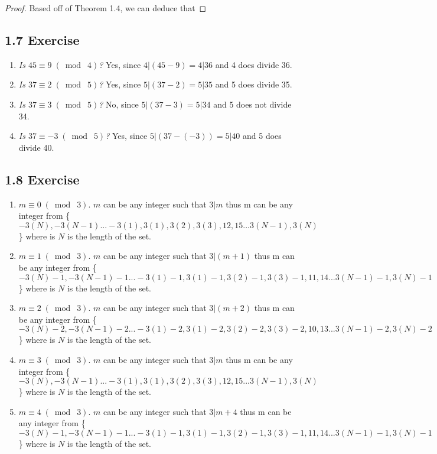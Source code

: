 \documentclass{article}
\begin{document}
\begin{proof}
Based off of Theorem 1.4, we can deduce that 
\end{proof}

\subsection*{1.7 Exercise} 
\begin{enumerate}
    \item \textit{Is $45 \equiv 9 \;(\bmod\; 4)$?}
    \newline Yes, since $4 \vert (45-9) = 4 \vert 36$ and 4 does divide 36.
    \item \textit{Is $37 \equiv 2 \;(\bmod\; 5)$?}
    \newline Yes, since $5 \vert (37-2) = 5 \vert 35$ and 5 does divide 35.
    \item \textit{Is $37 \equiv 3 \;(\bmod\; 5)$?}
    \newline No, since $5 \vert (37-3) = 5 \vert 34$ and 5 does not divide 34.
    \item \textit{Is $37 \equiv -3 \;(\bmod\; 5)$?}
    \newline Yes, since $5 \vert (37-(-3)) = 5 \vert 40$ and 5 does divide 40.
\end{enumerate}

\subsection*{1.8 Exercise} 
\begin{enumerate}
    \item $m \equiv 0 \;(\bmod\; 3)$.
    \newline $m$ can be any integer such that $3 \vert m$ thus m can be any integer from \{$-3(N), -3(N-1)...-3(1), 3(1),3(2),3(3),12,15...3(N-1), 3(N)$\} where is $N$ is the length of the set.
    \item $m \equiv 1 \;(\bmod\; 3)$.
    \newline $m$ can be any integer such that $3 \vert (m+1)$ thus m can be any integer from \{$-3(N)-1, -3(N-1)-1...-3(1)-1, 3(1)-1,3(2)-1,3(3)-1,11,14...3(N-1)-1, 3(N)-1$\} where is $N$ is the length of the set.
    \item $m \equiv 2 \;(\bmod\; 3)$.
    \newline $m$ can be any integer such that $3 \vert (m+2)$ thus m can be any integer from \{$-3(N)-2, -3(N-1)-2...-3(1)-2, 3(1)-2,3(2)-2,3(3)-2,10,13...3(N-1)-2, 3(N)-2$\} where is $N$ is the length of the set.
    \item $m \equiv 3 \;(\bmod\; 3)$.
    \newline $m$ can be any integer such that $3 \vert m$ thus m can be any integer from \{$-3(N), -3(N-1)...-3(1), 3(1),3(2),3(3),12,15...3(N-1), 3(N)$\} where is $N$ is the length of the set.
    \item $m \equiv 4 \;(\bmod\; 3)$.
    \newline $m$ can be any integer such that $3 \vert m+4$ thus m can be any integer from \{$-3(N)-1, -3(N-1)-1...-3(1)-1, 3(1)-1,3(2)-1,3(3)-1,11,14...3(N-1)-1, 3(N)-1$\} where is $N$ is the length of the set.
\end{enumerate}
\end{document}
